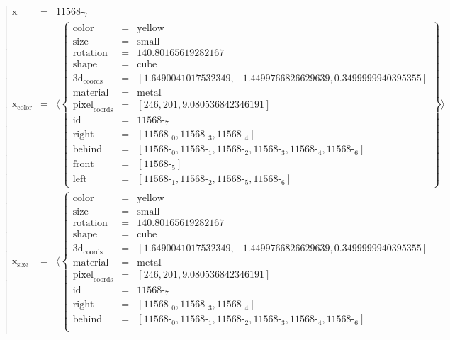 \documentclass{minimal}
\begin{document}
$$
\left[\begin{array}{rcl}
\text{x} &=& \text{11568-}_{\text{7}}\\
\text{x}_{\text{color}} &=& \langle \left\{\begin{array}{rcl}
\text{color} &=& \text{yellow}\\
\text{size} &=& \text{small}\\
\text{rotation} &=& 140.80165619282167\\
\text{shape} &=& \text{cube}\\
\text{3d}_{\text{coords}} &=& [ 1.6490041017532349, -1.4499766826629639, 0.3499999940395355]\\
\text{material} &=& \text{metal}\\
\text{pixel}_{\text{coords}} &=& [ 246, 201, 9.080536842346191]\\
\text{id} &=& \text{11568-}_{\text{7}}\\
\text{right} &=& [ \text{11568-}_{\text{0}}, \text{11568-}_{\text{3}}, \text{11568-}_{\text{4}}]\\
\text{behind} &=& [ \text{11568-}_{\text{0}}, \text{11568-}_{\text{1}}, \text{11568-}_{\text{2}}, \text{11568-}_{\text{3}}, \text{11568-}_{\text{4}}, \text{11568-}_{\text{6}}]\\
\text{front} &=& [ \text{11568-}_{\text{5}}]\\
\text{left} &=& [ \text{11568-}_{\text{1}}, \text{11568-}_{\text{2}}, \text{11568-}_{\text{5}}, \text{11568-}_{\text{6}}]
\end{array}\right\}\rangle\\
\text{x}_{\text{size}} &=& \langle \left\{\begin{array}{rcl}
\text{color} &=& \text{yellow}\\
\text{size} &=& \text{small}\\
\text{rotation} &=& 140.80165619282167\\
\text{shape} &=& \text{cube}\\
\text{3d}_{\text{coords}} &=& [ 1.6490041017532349, -1.4499766826629639, 0.3499999940395355]\\
\text{material} &=& \text{metal}\\
\text{pixel}_{\text{coords}} &=& [ 246, 201, 9.080536842346191]\\
\text{id} &=& \text{11568-}_{\text{7}}\\
\text{right} &=& [ \text{11568-}_{\text{0}}, \text{11568-}_{\text{3}}, \text{11568-}_{\text{4}}]\\
\text{behind} &=& [ \text{11568-}_{\text{0}}, \text{11568-}_{\text{1}}, \text{11568-}_{\text{2}}, \text{11568-}_{\text{3}}, \text{11568-}_{\text{4}}, \text{11568-}_{\text{6}}]\\

\end{array}
\end{array}$$
\end{document}
